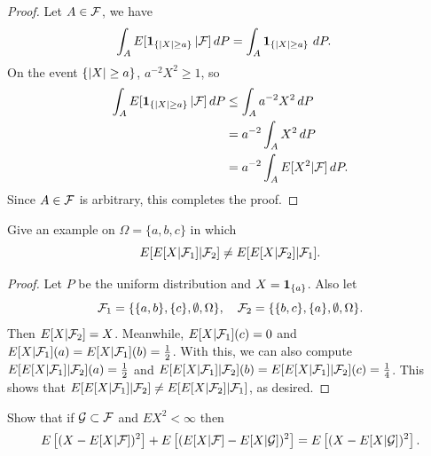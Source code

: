 \documentclass[a4paper]{article}
\begin{document}
\begin{proof}
  Let $A \in \mathcal{F}$, we have 
  \begin{align*}
    \int_A E[ \operatorname{\mathbf{1}}_{\{\left\lvert X\right\rvert \geq a\}} | \mathcal{F}] \, d P 
    &= \int_A \operatorname{\mathbf{1}}_{\{\left\lvert X\right\rvert \geq a\}} \, d P.
  \end{align*}
  On the event $\{\left\lvert X\right\rvert \geq a\}$, $a^{-2} X^2 \geq 1$, so 
  \begin{align*}
    \int_A E[ \operatorname{\mathbf{1}}_{\{\left\lvert X\right\rvert \geq a\}} | \mathcal{F}] \, d P 
    &\leq \int_A a^{-2} X^2 \, d P \\
    &= a^{-2} \int_A X^2 \, d P \\
    &= a^{-2} \int_A E [X^2 | \mathcal{F}] \, d P.
  \end{align*}
  Since $A \in \mathcal{F}$ is arbitrary, this completes the proof.

\end{proof}

\begin{ex}[Durrett 4.1.5]
  Give an example on $\Omega = \{a, b, c\}$ in which 
  \[
  E [E [X | \mathcal{F}_1] | \mathcal{F}_2] \neq E [E [X | \mathcal{F}_2] | \mathcal{F}_1].
  \]
\end{ex}

\begin{proof}
  Let $P$ be the uniform distribution and $X = \operatorname{\mathbf{1}}_{\{a\}}$. 
  Also let 
  \[
  \mathcal{F}_1 = \{ \{a, b\}, \{c\}, \emptyset, \Omega\}, \quad 
  \mathcal{F}_2 = \{ \{b, c\}, \{a\}, \emptyset, \Omega\}.
  \]
  Then $E[X | \mathcal{F}_2] = X$. Meanwhile, $E[X | \mathcal{F}_1] (c) = 0$
  and $E[X | \mathcal{F}_1] (a) = E[X | \mathcal{F}_1] (b) = \frac{1}{2}$. With this, 
  we can also compute $E[E[X | \mathcal{F}_1] | \mathcal{F}_2] (a) = \frac{1}{2}$
  and $E[E[X | \mathcal{F}_1] | \mathcal{F}_2] (b) = E[E[X | \mathcal{F}_1] | \mathcal{F}_2] (c)
  = \frac{1}{4}$. This shows that $E [E [X | \mathcal{F}_1] | \mathcal{F}_2] \neq 
  E [E [X | \mathcal{F}_2] | \mathcal{F}_1]$, as desired.

\end{proof}

\begin{ex}[Durrett 4.1.6]
  Show that if $\mathcal{G} \subset \mathcal{F}$ and $E X^2 < \infty$ then 
  \[
  E \left[ (X - E[X | \mathcal{F}])^2 \right]
  + E \left[ (E [X | \mathcal{F}] - E[X | \mathcal{G}])^2 \right]
  = E \left[ (X - E [X | \mathcal{G}])^2 \right].
  \]
\end{ex}
\end{document}
